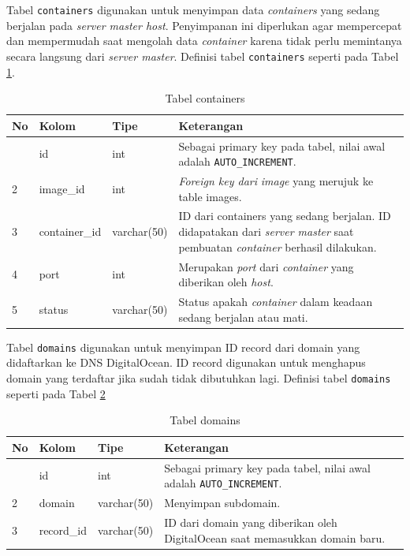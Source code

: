         \indent Tabel \texttt{containers} digunakan untuk menyimpan data \textit{containers} yang sedang berjalan pada \textit{server master host}. Penyimpanan ini diperlukan agar mempercepat dan mempermudah saat mengolah data \textit{container} karena tidak perlu memintanya secara langsung dari \textit{server master}. Definisi tabel \texttt{containers} seperti pada Tabel \ref{tabelContainers}.
        
        \begin{longtable}{|p{}|p{}|p{}|p{}|}
			\caption{Tabel containers} \label{tabelContainers} \\
			\hline
			\textbf{No} & \textbf{Kolom} & \textbf{Tipe} & \textbf{Keterangan} \\ \hline
			\endhead
			\endfoot
			\endlastfoot
			1 & id & int & Sebagai primary key pada tabel, nilai awal adalah \texttt{AUTO\_INCREMENT}. \\ \hline
			2 & image\_id & int & \textit{Foreign key dari} \textit{image} yang merujuk ke table images. \\ \hline
			3 & container\_id & varchar(50) & ID dari containers yang sedang berjalan. ID didapatakan dari \textit{server master} saat pembuatan \textit{container} berhasil dilakukan.  \\ \hline
			4 & port & int & Merupakan \textit{port} dari \textit{container} yang diberikan oleh \textit{host}. \\ \hline
			5 & status & varchar(50) & Status apakah \textit{container} dalam keadaan sedang berjalan atau mati. \\ \hline
		\end{longtable}
        
        \indent Tabel \texttt{domains} digunakan untuk menyimpan ID record dari domain yang didaftarkan ke DNS DigitalOcean. ID record digunakan untuk menghapus domain yang terdaftar jika sudah tidak dibutuhkan lagi. Definisi tabel \texttt{domains} seperti pada Tabel \ref{tabelDomains}
        
        \begin{longtable}{|p{}|p{}|p{}|p{}|}
			\caption{Tabel domains} \label{tabelDomains} \\
			\hline
			\textbf{No} & \textbf{Kolom} & \textbf{Tipe} & \textbf{Keterangan} \\ \hline
			\endhead
			\endfoot
			\endlastfoot
			1 & id & int & Sebagai primary key pada tabel, nilai awal adalah \texttt{AUTO\_INCREMENT}. \\ \hline
			2 & domain & varchar(50) & Menyimpan subdomain. \\ \hline
			3 & record\_id & varchar(50) & ID dari domain yang diberikan oleh DigitalOcean saat memasukkan domain baru. \\ \hline
		\end{longtable}
 
